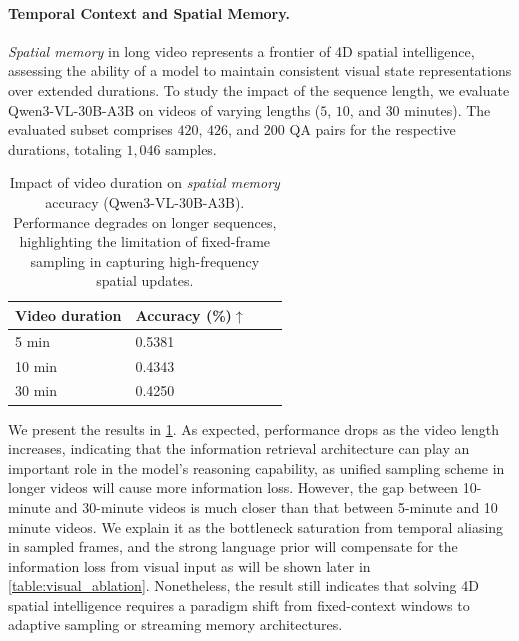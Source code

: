 \documentclass{article}
\begin{document}
\paragraph{Temporal Context and Spatial Memory.}
\textit{Spatial memory} in long video represents a frontier of 4D spatial intelligence, assessing the ability of a model to maintain consistent visual state representations over extended durations.
To study the impact of the sequence length, we evaluate Qwen3-VL-30B-A3B on videos of varying lengths ($5$, $10$, and $30$ minutes).
The evaluated subset comprises $420$, $426$, and $200$ QA pairs for the respective durations, totaling $1,046$ samples.
\begin{table}
    \centering
    \begin{tabular}{llll}	 
    \toprule 
         \textbf{Video duration}     & \textbf{Accuracy (\%)$\uparrow$} \\         
         \midrule
         5 min     & 0.5381 \\
         10 min    & 0.4343 \\
         30 min    & 0.4250 \\   
    \bottomrule    
	\end{tabular}
    \caption{Impact of video duration on \textit{spatial memory} accuracy (Qwen3-VL-30B-A3B). Performance degrades on longer sequences, highlighting the limitation of fixed-frame sampling in capturing high-frequency spatial updates.}
    \label{table:spatial_memory_video_length}
\end{table}
We present the results in \cref{table:spatial_memory_video_length}.
As expected, performance drops as the video length increases, indicating that the information retrieval architecture can play an important role in the model's reasoning capability, as unified sampling scheme in longer videos will cause more information loss. However, the gap between 10-minute and 30-minute videos is much closer than that between 5-minute and 10 minute videos. We explain it as the bottleneck saturation from temporal aliasing in sampled frames, and the strong language prior will compensate for the information loss from visual input as will be shown later in \cref{table:visual_ablation}. Nonetheless, the result still indicates that solving 4D spatial intelligence requires a paradigm shift from fixed-context windows to adaptive sampling or streaming memory architectures.
\end{document}
